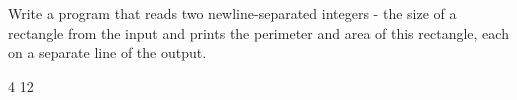 




Write a program that reads two newline-separated integers - the size of a rectangle from the input and prints
the perimeter and area of this rectangle, each on a separate line of the output.

4
12
\koniec

